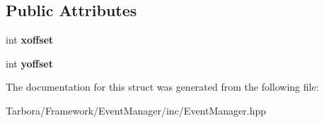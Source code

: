\subsection*{Public Attributes}
\begin{DoxyCompactItemize}
\item 
\mbox{\label{structTarbora_1_1MouseScrollEvent_a4ec018330120ae059a6407fd5de902a7}} 
int {\bfseries xoffset}
\item 
\mbox{\label{structTarbora_1_1MouseScrollEvent_a9bc6fec189c17e9405b66b688d9d25a1}} 
int {\bfseries yoffset}
\end{DoxyCompactItemize}


The documentation for this struct was generated from the following file\+:\begin{DoxyCompactItemize}
\item 
Tarbora/\+Framework/\+Event\+Manager/inc/Event\+Manager.\+hpp\end{DoxyCompactItemize}
